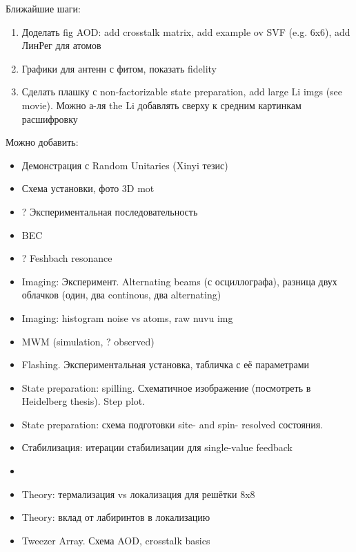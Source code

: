 \documentclass[twoside]{article}
\begin{document}




 






Ближайшие шаги:
\begin{enumerate}
	\item Доделать fig AOD: add crosstalk matrix, add example ov SVF (e.g. 6x6), add ЛинРег для атомов
	\item Графики для антенн с фитом, показать fidelity
	\item Сделать плашку с non-factorizable state preparation, add large Li imgs (see movie). Можно а-ля the Li добавлять сверху к средним картинкам расшифровку
\end{enumerate}

Можно добавить:
\begin{itemize}
	\item Демонстрация с Random Unitaries (Xinyi тезис)
	\item Схема установки, фото 3D mot
	\item ? Экспериментальная последовательность
	\item BEC
	\item ? Feshbach resonance
	\item Imaging: Эксперимент. Alternating beams (с осциллографа), разница двух облачков (один, два continous, два alternating)
	\item Imaging: histogram noise vs atoms, raw nuvu img
	\item MWM (simulation, ? observed)
	\item Flashing. Экспериментальная установка, табличка с её параметрами
	\item State preparation: spilling. Схематичное изображение (посмотреть в Heidelberg thesis). Step plot. 
	\item State preparation: схема подготовки site- and spin- resolved состояния.
	\item Стабилизация: итерации стабилизации для single-value feedback
	\item {}
	\item Theory: термализация vs локализация для решётки 8x8
	\item Theory: вклад от лабиринтов в локализацию
	\item Tweezer Array. Схема AOD, crosstalk basics
\end{itemize}
\end{document}
